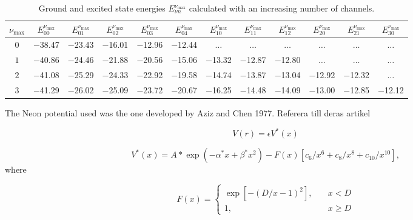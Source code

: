 \documentclass[]{article}
\begin{document}
\begin{table}[h!]
	\centering
	\footnotesize
	\begin{adjustwidth}{-0.1cm}{}
		\tabcolsep=0.10cm
		\begin{tabular}{||c c c c c c c c c c c c||} 
			\hline
			$\nu_{\text{max}}$ & 
			$E^{\nu_{\text{max}}}_{00}$ & $E^{\nu_{\text{max}}}_{01}$ & $E^{\nu_{\text{max}}}_{02}$ & $E^{\nu_{\text{max}}}_{03}$ &
			$E^{\nu_{\text{max}}}_{04}$ &
			$E^{\nu_{\text{max}}}_{10}$ &
			$E^{\nu_{\text{max}}}_{11}$ &
			$E^{\nu_{\text{max}}}_{12}$ &
			$E^{\nu_{\text{max}}}_{20}$ &
			$E^{\nu_{\text{max}}}_{21}$ & $E^{\nu_{\text{max}}}_{30}$ \Tstrut\Bstrut \\ [0.7ex]
			\hline\hline  \Tstrut\Bstrut
			$0$   & $-$38.47  & $-$23.43 & $-$16.01 & $-$12.96 & $-$12.44 & $\dots$ & $\dots$ & $\dots$ & $\dots$ & $\dots$ & $\dots$\\
			$1$   & $-$40.86  & $-$24.46 & $-$21.88 & $-$20.56 & $-$15.06 & $-$13.32 & $-$12.87 & $-$12.80 & $\dots$ & $\dots$ & $\dots$ \\
			$2$   & $-$41.08  & $-$25.29 & $-$24.33 & $-$22.92 & $-$19.58 & $-$14.74 & $-$13.87 & $-$13.04 & $-$12.92 & $-$12.32 & $\dots$ \\
			$3$   & $-$41.29  & $-$26.02 & $-$25.09 & $-$23.72 & $-$20.67 & $-$16.25 & $-$14.48 & $-$14.09 & $-$13.00 & $-$12.85 & $-$12.12 \\ [0.7ex]
			\hline 
		\end{tabular}
	\end{adjustwidth}
	\caption{Ground and excited state energies $E^{\nu_{\text{max}}}_{\nu n}$ calculated with an increasing number of channels.}
	\label{table:neon}
\end{table} 


The Neon potential used was the one developed by Aziz and Chen 1977. Referera till deras artikel

\begin{equation}
V(r) = \epsilon V^*(x)
\end{equation}

\begin{equation}
V^*(x) = A*\exp(-\alpha^*x+\beta^*x^2)-F(x)[c_6/x^6+c_8/x^8+c_{10}/x^{10}],
\end{equation}
where

\begin{equation}
F(x)=
\begin{cases}
\exp[-(D/x-1)^2], \quad &x<D\\
1, \quad &x \ge D
\end{cases}
\end{equation}
\end{document}

